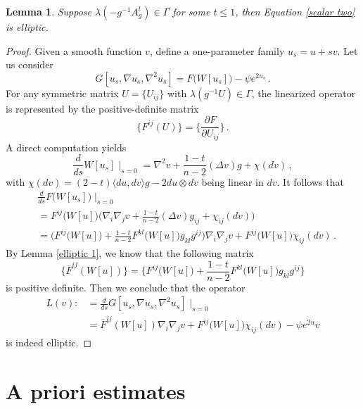 \documentclass{article}
\theoremstyle{plain}
\newtheorem{lemma}[theorem]{Lemma}
\theoremstyle{definition}
\theoremstyle{definition}
\numberwithin{equation}{section}
\begin{document}
\begin{sloppypar}
\begin{lemma}\label{elliptic}
Suppose $\lambda(-g^{-1}A_{g}^{t})\in \Gamma$ for some $t\leq 1$, then Equation \eqref{scalar two} is elliptic.
\end{lemma}
\begin{proof}
Given a smooth function $v$, define a one-parameter family $u_{s}=u+s v$. Let us consider
\[
G[u_s,\nabla u_s,\nabla^2u_s]=F\big(W[u_{s}]\big)-\psi e^{2u_{s}}\,.
\]
For any symmetric matrix $U=\{U_{ij}\}$ with $\lambda(g^{-1}U)\in \Gamma$,  the linearized operator is represented by the positive-definite matrix
\[
\big\{F^{ij}(U)\big\}=\bigg\{\frac{\partial F}{\partial U_{ij}}\bigg\}\,.
\]
A direct computation yields
\[
\frac{d}{ds}W[u_{s}]\mid_{s=0}=\nabla^2v+\frac{1-t}{n-2}(\Delta v)g+\chi(dv)\,,  
\]
with $\chi(dv)=(2-t)\langle du,dv\rangle g -2du\otimes dv$ being linear in $dv$. It follows that
\[
\begin{split}
&\frac{d}{ds}F\big(W[u_{s}]\big)\mid_{s=0}\\
&=F^{ij}\big(W[u]\big)\Big(\nabla_{i}\nabla_{j}v+\frac{1-t}{n-2}(\Delta v)g_{ij}+\chi_{ij}(dv) \Big)\\
&=\Big(F^{ij}\big(W[u]\big)+\frac{1-t}{n-2}F^{kl}\big(W[u]\big)g_{kl}g^{ij}\Big)\nabla_{i}\nabla_{j}v+F^{ij}\big(W[u]\big)\chi_{ij}(dv)\,.
\end{split}
\]
By Lemma \ref{elliptic 1}, we know that the following matrix 
\begin{equation}\label{cofactor}
\big\{\overline{F}^{ij}(W[u])\big\}=\Big\{F^{ij}\big(W[u]\big)+\frac{1-t}{n-2}F^{kl}\big(W[u]\big)g_{kl} g^{ij}\Big\}
\end{equation}
is positive definite. Then we conclude that the operator
\[
\begin{split}
L(v):&=\frac{d}{ds}G[u_s,\nabla u_s,\nabla^2u_s]\mid_{s=0}\\
&=\overline{F}^{ij}(W[u])\nabla_{i}\nabla_{j}v+F^{ij}\big(W[u]\big)\chi_{ij}(dv)-\psi e^{2u}v
\end{split}
\]
is indeed elliptic.
\end{proof}



\section{A priori estimates}


\end{sloppypar}
\end{document}
